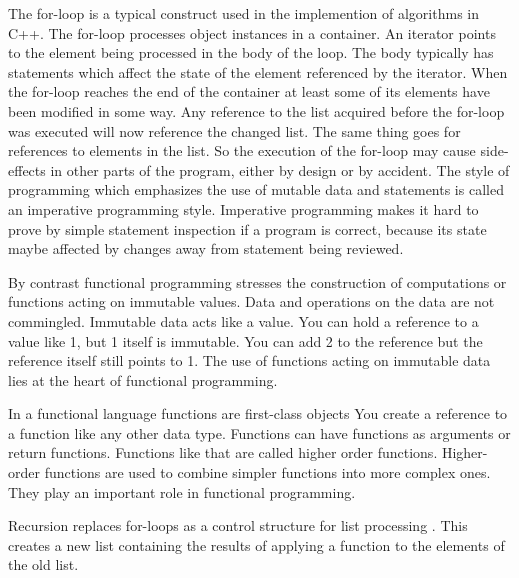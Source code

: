 \documentclass[12pt,fleqn]{article}
\begin{document}
The for-loop is a typical construct used in the implemention of algorithms in C++.
The for-loop  processes object instances in a container.
An iterator points to the element being processed in the body of the loop.
The body typically has statements which affect the state of the element referenced by the iterator.
When the for-loop reaches the end of the container at least some of its elements have been modified in some way.
Any reference to the list acquired before the for-loop was executed will now reference the changed list.
The same thing goes for references to elements in the list.
So the execution of the for-loop may cause side-effects in other parts of the program, either by design or by accident.
The style of programming which emphasizes the use of mutable data and statements is called an imperative programming style.
Imperative programming makes it hard to prove by simple statement inspection if a program is correct, because its state maybe affected by changes away from statement being reviewed.

By contrast functional programming stresses the construction of computations or functions acting on immutable values.
Data and operations on the data are not commingled.
Immutable data acts like a value. 
You can hold a reference to a value like 1, but 1 itself is immutable.
You can add 2 to the reference but the reference itself still points to 1.
The use of functions acting on immutable data lies at the heart of functional programming.

In a functional language functions are first-class objects 
You create a reference to a function like any other data type.
Functions can have functions as arguments or return functions.
Functions like that are called higher order functions.
Higher-order functions are used to combine simpler functions into more complex ones.
They play an important role in functional programming.

Recursion replaces for-loops as a control structure for list processing \cite{hutton, bird}.
This creates a new list containing the results of applying a function to the elements of the old list. 
\end{document}
